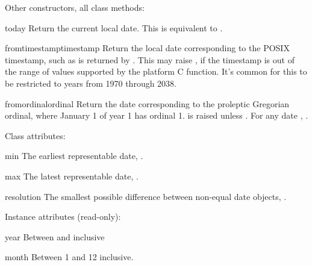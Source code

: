 Other constructors, all class methods:

\begin{methoddesc}{today}{}
  Return the current local date.  This is equivalent to
  .
\end{methoddesc}

\begin{methoddesc}{fromtimestamp}{timestamp}
  Return the local date corresponding to the POSIX timestamp, such
  as is returned by .  This may raise
  , if the timestamp is out of the range of
  values supported by the platform C 
  function.  It's common for this to be restricted to years from 1970
  through 2038.
\end{methoddesc}

\begin{methoddesc}{fromordinal}{ordinal}
  Return the date corresponding to the proleptic Gregorian ordinal,
  where January 1 of year 1 has ordinal 1.   is
  raised unless .
  For any date , .
\end{methoddesc}

Class attributes:

\begin{memberdesc}{min}
  The earliest representable date, .
\end{memberdesc}

\begin{memberdesc}{max}
  The latest representable date, .
\end{memberdesc}

\begin{memberdesc}{resolution}
  The smallest possible difference between non-equal date
  objects, .
\end{memberdesc}

Instance attributes (read-only):

\begin{memberdesc}{year}
  Between  and  inclusive
\end{memberdesc}

\begin{memberdesc}{month}
  Between 1 and 12 inclusive.
\end{memberdesc}

